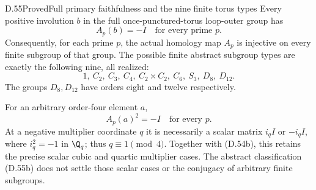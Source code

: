 \begin{claim}{D.55}{Proved}{Full primary faithfulness and the nine finite torus types}
Every positive involution $b$ in the full
once-punctured-torus loop-outer group has
\[
                      A_p(b)=-I
                           \quad\text{for every prime }p.
                                                               \tag{D.55a}
\]
Consequently, for each prime $p$, the actual
homology map $A_p$ is injective on every
finite subgroup of that group.
The possible finite abstract subgroup
types are exactly the following nine,
all realized:
\[
       1,\ C_2,\ C_3,\ C_4,\ C_2\times C_2,\ C_6,\
                                      S_3,\ D_8,\ D_{12}.
                                                               \tag{D.55b}
\]
The groups $D_8,D_{12}$ have orders eight
and twelve respectively.

For an arbitrary order-four element $a$,
\[
                A_p(a)^2=-I\quad\text{for every }p.
                                                               \tag{D.55c}
\]
At a negative multiplier coordinate $q$
it is necessarily a scalar matrix
$i_q I$ or $-i_q I$, where $i_q^2=-1$
in $\Q_q$; thus $q\equiv1\pmod4$.
Together with (D.54b), this retains
the precise scalar cubic and quartic
multiplier cases. The abstract
classification (D.55b) does not
settle those scalar cases or the
conjugacy of arbitrary finite subgroups.
\end{claim}
